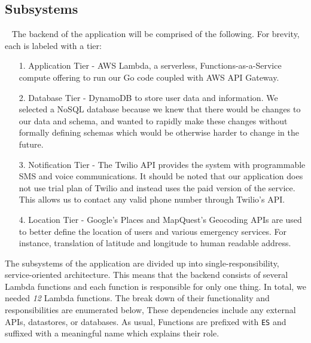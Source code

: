 \documentclass[10pt, a4paper]{article}
\begin{document}
\subsection{Subsystems}
\par ~ The backend of the application will be comprised of the following. For brevity, each is labeled with a tier:
\begin{enumerate}
	\item[1.] Application Tier - AWS Lambda, a serverless, Functions-as-a-Service compute offering to run our Go code coupled with AWS API Gateway.
	\item[2.] Database Tier - DynamoDB to store user data and information. We selected a NoSQL database because we knew that there would be changes to our data and schema, and wanted to rapidly make these changes without formally defining schemas which would be otherwise harder to change in the future.
	\item[3.] Notification Tier - The Twilio API provides the system with programmable SMS and voice communications. It should be noted that our application does not use trial plan of Twilio and instead uses the paid version of the service. This allows us to contact any valid phone number through Twilio's API.
	\item[4.] Location Tier - Google's Places and MapQuest's Geocoding APIs are used to better define the location of users and various emergency services. For instance, translation of latitude and longitude to human readable address.
\end{enumerate}

The subsystems of the application are divided up into single-responsibility, service-oriented architecture. This means that the backend consists of several Lambda functions and each function is responsible for only one thing. In total, we needed \emph{12} Lambda functions. The break down of their functionality and responsibilities are enumerated below, These dependencies include any external APIs, datastores, or databases. As usual, Functions are prefixed with \texttt{ES} and suffixed with a meaningful name which explains their role.
\end{document}

